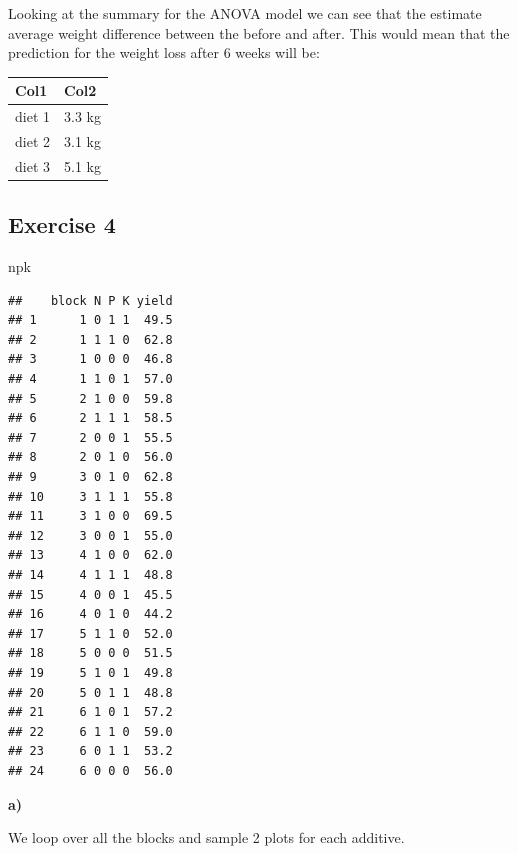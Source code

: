 \documentclass[
]{article}
\newenvironment{Shaded}{\begin{snugshade}}{\end{snugshade}}
\newcommand{\NormalTok}[1]{#1}
\begin{document}
Looking at the summary for the ANOVA model we can see that the estimate
average weight difference between the before and after. This would mean
that the prediction for the weight loss after 6 weeks will be:

\begin{longtable}[]{@{}ll@{}}
\toprule()
Col1 & Col2 \\
\midrule()
\endhead
diet 1 & 3.3 kg \\
diet 2 & 3.1 kg \\
diet 3 & 5.1 kg \\
\bottomrule()
\end{longtable}

\hypertarget{exercise-4}{%
\subsection{Exercise 4}\label{exercise-4}}

\begin{Shaded}
\begin{Highlighting}[]
\NormalTok{npk}
\end{Highlighting}
\end{Shaded}

\begin{verbatim}
##    block N P K yield
## 1      1 0 1 1  49.5
## 2      1 1 1 0  62.8
## 3      1 0 0 0  46.8
## 4      1 1 0 1  57.0
## 5      2 1 0 0  59.8
## 6      2 1 1 1  58.5
## 7      2 0 0 1  55.5
## 8      2 0 1 0  56.0
## 9      3 0 1 0  62.8
## 10     3 1 1 1  55.8
## 11     3 1 0 0  69.5
## 12     3 0 0 1  55.0
## 13     4 1 0 0  62.0
## 14     4 1 1 1  48.8
## 15     4 0 0 1  45.5
## 16     4 0 1 0  44.2
## 17     5 1 1 0  52.0
## 18     5 0 0 0  51.5
## 19     5 1 0 1  49.8
## 20     5 0 1 1  48.8
## 21     6 1 0 1  57.2
## 22     6 1 1 0  59.0
## 23     6 0 1 1  53.2
## 24     6 0 0 0  56.0
\end{verbatim}

\textbf{a)}

We loop over all the blocks and sample 2 plots for each additive.
\end{document}
